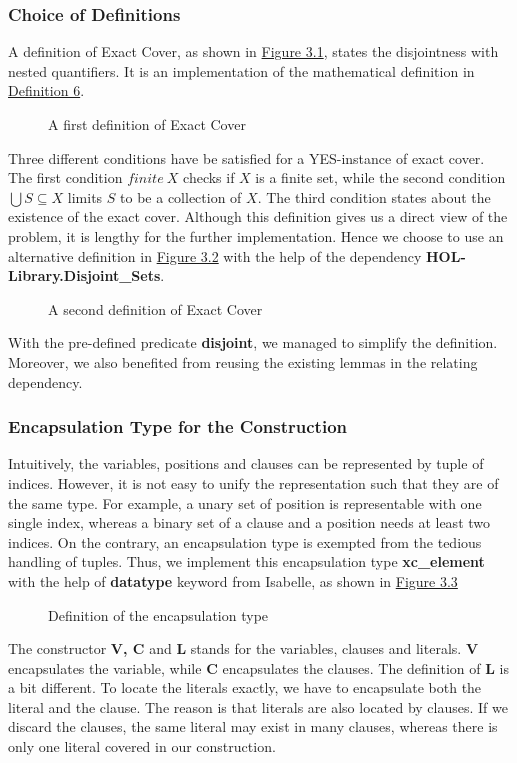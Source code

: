 \subsubsection{Choice of Definitions}
A definition of Exact Cover, as shown in \hyperref[figure:3]{Figure 3.1}, states the disjointness with nested quantifiers.
It is an implementation of the mathematical definition in \hyperref[eq:0]{Definition 6}.
\begin{figure}[h!]
    \caption{A first definition of Exact Cover}
    \label{figure:3}
\end{figure}
Three different conditions have be satisfied for a YES-instance of exact cover.
The first condition $finite\ X$ checks if $X$ is a finite set, while the second 
condition $\bigcup S \subseteq X$ limits $S$ to be a collection of $X$. The third 
condition states about the existence of the exact cover. Although this definition gives us a direct 
view of the problem, it is lengthy for the further implementation. Hence we choose to use 
an alternative definition in \hyperref[figure:4]{Figure 3.2} with the help of the dependency \textbf{HOL-Library.Disjoint\_Sets}.
\begin{figure}[h!]
    \caption{A second definition of Exact Cover}
    \label{figure:4}
\end{figure}
With the pre-defined predicate \textbf{disjoint}, we managed to simplify the definition. Moreover, 
we also benefited from reusing the existing lemmas in the relating dependency.

\subsubsection{Encapsulation Type for the Construction}
Intuitively, the variables, positions and clauses can be represented by tuple of indices. However, it is not easy 
to unify the representation such that they are of the same type. For example, a unary set of position is representable with
one single index, whereas a binary set of a clause and a position needs at least two indices. 
On the contrary, an encapsulation type is exempted from the tedious handling of tuples.
Thus, we implement this encapsulation type \textbf{xc\_element} with the help of \textbf{datatype} keyword from Isabelle, 
as shown in \hyperref[figure:5]{Figure 3.3}
\begin{figure}[h!]
    \caption{Definition of the encapsulation type}
    \label{figure:5}
\end{figure}
The constructor \textbf{V, C} and \textbf{L} stands for the variables, clauses and literals. \textbf{V} 
encapsulates the variable, while \textbf{C} encapsulates the clauses. The definition of \textbf{L} is a bit different.
To locate the literals exactly, we have to encapsulate both the literal and the clause. The reason is that literals are 
also located by clauses. If we discard the clauses, the same literal may exist in many clauses, 
whereas there is only one literal covered in our construction.


